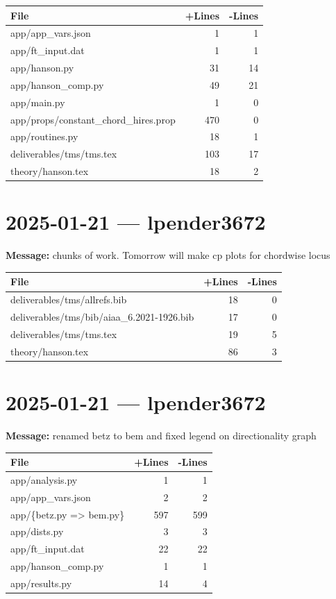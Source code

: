 \documentclass{article}
\begin{document}
\begin{longtable}{|p{10cm}|r|r|}
\hline \textbf{File} & \textbf{+Lines} & \textbf{-Lines} \\
\hline
app/app\_vars.json & 1 & 1 \\
\hline
app/ft\_input.dat & 1 & 1 \\
\hline
app/hanson.py & 31 & 14 \\
\hline
app/hanson\_comp.py & 49 & 21 \\
\hline
app/main.py & 1 & 0 \\
\hline
app/props/constant\_chord\_hires.prop & 470 & 0 \\
\hline
app/routines.py & 18 & 1 \\
\hline
deliverables/tms/tms.tex & 103 & 17 \\
\hline
theory/hanson.tex & 18 & 2 \\
\hline
\end{longtable}

\section*{2025-01-21 --- lpender3672}
\textbf{Message:} chunks of work. Tomorrow will make cp plots for chordwise locus

\begin{longtable}{|p{10cm}|r|r|}
\hline \textbf{File} & \textbf{+Lines} & \textbf{-Lines} \\
\hline
deliverables/tms/allrefs.bib & 18 & 0 \\
\hline
deliverables/tms/bib/aiaa\_6.2021-1926.bib & 17 & 0 \\
\hline
deliverables/tms/tms.tex & 19 & 5 \\
\hline
theory/hanson.tex & 86 & 3 \\
\hline
\end{longtable}

\section*{2025-01-21 --- lpender3672}
\textbf{Message:} renamed betz to bem and fixed legend on directionality graph

\begin{longtable}{|p{10cm}|r|r|}
\hline \textbf{File} & \textbf{+Lines} & \textbf{-Lines} \\
\hline
app/analysis.py & 1 & 1 \\
\hline
app/app\_vars.json & 2 & 2 \\
\hline
app/\{betz.py => bem.py\} & 597 & 599 \\
\hline
app/dists.py & 3 & 3 \\
\hline
app/ft\_input.dat & 22 & 22 \\
\hline
app/hanson\_comp.py & 1 & 1 \\
\hline
app/results.py & 14 & 4 \\
\hline
\end{longtable}
\end{document}
